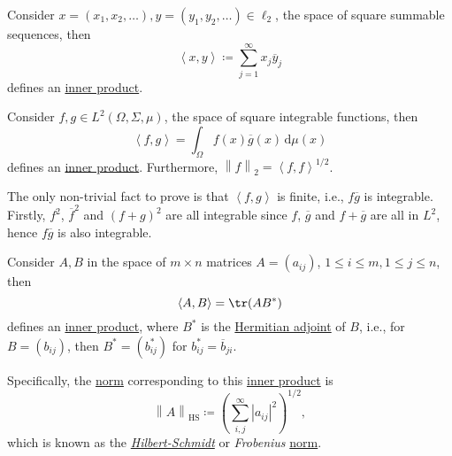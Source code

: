 \begin{eg}
	Consider \(x=(x_1, x_2, \dots ), y=(y_1, y_2, \dots )\in \ell _2\), the space of square summable sequences, then
	\[
		\left\langle x, y \right\rangle \coloneqq \sum_{j=1}^{\infty} x_j \overline{y} _j
	\]
	defines an \hyperref[def:inner-product]{inner product}.
\end{eg}

\begin{eg}
	Consider \(f, g\in L^2(\Omega , \Sigma , \mu )\), the space of square integrable functions, then
	\[
		\left\langle f, g \right\rangle = \int _\Omega f(x) \overline{g} (x)\,\mathrm{d} \mu (x)
	\]
	defines an \hyperref[def:inner-product]{inner product}. Furthermore, \(\left\lVert f\right\rVert _2 = \left\langle f, f \right\rangle ^{1 / 2}\).
\end{eg}
\begin{explanation}
	The only non-trivial fact to prove is that \(\left\langle f, g \right\rangle \) is finite, i.e., \(f \overline{g} \) is integrable. Firstly, \(f^{2} \), \(\overline{f} ^{2} \) and \((f + g)^{2} \) are all integrable since \(f\), \(\overline{g} \) and \(f+\overline{g} \) are all in \(L^2\), hence \(f \overline{g} \) is also integrable.
\end{explanation}

\begin{eg}
	Consider \(A, B\) in the space of \(m \times n\) matrices \(A = (a_{ij} )\), \(1 \leq i\leq m, 1 \leq j\leq n\), then
	\[
		\left\langle A, B \right\rangle = \tr(A B^{\ast})
	\]
	defines an \hyperref[def:inner-product]{inner product}, where \(B^{\ast} \) is the \href{https://en.wikipedia.org/wiki/Hermitian_adjoint}{Hermitian adjoint} of \(B\), i.e., for \(B = (b_{ij})\), then \(B^{\ast} = (b^{\ast} _{ij})\) for \(b^{\ast} _{ij} = \overline{b}_{ji}\).

	\begin{remark}
		Specifically, the \hyperref[def:norm]{norm} corresponding to this \hyperref[def:inner-product]{inner product} is
		\[
			\left\lVert A\right\rVert _{\mathrm{HS} }\coloneqq \left(\sum_{i, j}^{\infty} \left\vert a_{ij}  \right\vert ^{2} \right)^{1 / 2},
		\]
		which is known as the \href{https://en.wikipedia.org/wiki/Hilbert%E2%80%93Schmidt_operator}{\emph{Hilbert-Schmidt}} or \emph{Frobenius} \hyperref[def:norm]{norm}.
	\end{remark}
\end{eg}

